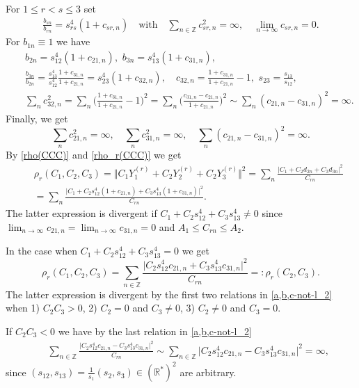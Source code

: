 \documentclass[10pt,a4paper]{amsart}
\begin{document}
\begin{pf} 
 For $1\leq r<s\leq 3$  set 
 \begin{eqnarray*}
\frac{b_{sn}}{b_{rn}}\!=\!s^4_{rs}(1\!+\!c_{sr,n})\quad\text{with}\quad \sum_{n\in\mathbb Z}c^2_{sr,n}  =\infty,
\quad \lim_{n\to\infty}c_{sr,n}=0.
\end{eqnarray*}
For $b_{1n}\equiv 1$ we have
\begin{eqnarray*}
&&
b_{2n}=s^4_{12}(1+c_{21,n}),\,\,
b_{3n}=s^4_{13}(1+c_{31,n}),\,\,
\\
&&
\frac{b_{3n}}{b_{2n}}=\frac{s^4_{13}}{s^4_{12}}\frac{1+c_{31,n}}{1+c_{21,n}}=s^4_{23}(1+c_{32,n}),
\quad c_{32,n}=\frac{1+c_{31,n}}{1+c_{21,n}}-1,\,\,
s_{23}=\frac{s_{13}}{s_{12}},\\
&&
\sum_nc^2_{32,n}\! =\!\sum_n\Big(\frac{1+c_{31,n}}{1+c_{21,n}}\!-\!1\Big)^2\!\!
=\!\sum_n\Big(\frac{c_{31,n}\!-\!c_{21,n}}{1+c_{21,n}}\Big)^2\!\sim\!
\sum_n(c_{21,n}\!-\!c_{31,n})^2\!=\!\infty.
\end{eqnarray*}
Finally, we get
\begin{equation}
 \label{a,b,c-not-l_2}
\sum_nc_{21,n}^2=\infty,\quad \sum_nc_{31,n}^2=\infty,\quad \sum_n(c_{21,n}-c_{31,n})^2=\infty.
\end{equation}
%
By \eqref{rho(CCC)} and \eqref{rho_r(CCC)} we get
\begin{eqnarray*}
&&
\rho_r(C_1,C_2,C_3)\!=\!
\Vert C_1Y_1^{(r)}\!+\!C_2Y_2^{(r)}\!+\!C_2Y_3^{(r)}\Vert ^2\!=\!
\sum_n\frac{\vert C_1+C_2d_{2n}+C_3d_{3n}\vert^2}
 {C_{rn}} \\
 &&
 =\sum_n\frac{\vert C_1+C_2s^4_{12}(1+c_{21,n})+C_3s^4_{13}(1+c_{31,n})\vert^2}
 {C_{rn}}.
\end{eqnarray*}
The latter expression is divergent if $C_1+C_2s^4_{12}+C_3s^4_{13}\not=0$ since 
$\lim_{n\to\infty}c_{21,n}=\lim_{n\to\infty}c_{31,n}=0$ and $A_1\leq C_{rn}\leq A_2$. 


In the case  when $C_1+C_2s^4_{12}+C_3s^4_{13}=0$ we get
\begin{equation}
 \label{rho(CC)}
 \rho_r(C_1,C_2,C_3)=\sum_{n\in \mathbb Z}
 \frac{\vert C_2s^4_{12}c_{21,n}+C_3s^4_{13}c_{31,n}\vert^2}
 {C_{rn}}=:\rho_r(C_2,C_3).
\end{equation}
The latter expression is divergent by the first two relations in \eqref{a,b,c-not-l_2} when 1) $C_2C_3>0$, 2)
$C_2=0$ and $C_3\not=0$, 3)  $C_2\not=0$ and $C_3=0$. 

If $C_2C_3<0$ we have  by the last relation in \eqref{a,b,c-not-l_2}
\begin{eqnarray*}
&&
\sum_{n\in \mathbb Z}
 \frac{\vert C_2s^4_{12}c_{21,n}-C_3s^4_{13}c_{31,n}\vert^2}
 {C_{rn}}\sim 
 \sum_{n\in \mathbb Z}\vert C_2s^4_{12}c_{21,n}-C_3s^4_{13}c_{31,n}\vert^2=\infty,
\end{eqnarray*}
since $(s_{12},s_{13})=\frac{1}{s_1}(s_{2},s_{3})\in(\mathbb R^*)^2$ are arbitrary.


\end{pf}
\end{document}
